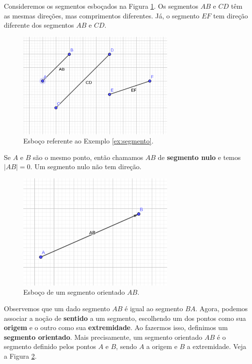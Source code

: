 \begin{ex}\label{ex:segmento}
  Consideremos os segmentos esboçados na Figura \ref{fig:ex_segmento}. Os segmentos $AB$ e $CD$ têm as mesmas direções, mas comprimentos diferentes. Já, o segmento $EF$ tem direção diferente dos segmentos $AB$ e $CD$.
  
  \begin{figure}[h!]
    \centering
    \includegraphics[width=0.7\textwidth]{./cap_vetor/dados/fig_ex_segmento/fig_ex_segmento}
  \caption{Esboço referente ao Exemplo \ref{ex:segmento}.}
  \label{fig:ex_segmento}
\end{figure}
\end{ex}

Se $A$ e $B$ são o mesmo ponto, então chamamos $AB$ de {\bf segmento nulo} e temos $|AB| = 0$. Um segmento nulo não tem direção.

\begin{figure}[h!]
  \centering
  \includegraphics[width=0.7\textwidth]{./cap_vetor/dados/fig_seg_orientado/fig_seg_orientado}
  \caption{Esboço de um segmento orientado $AB$.}
  \label{fig:seg_orientado}
\end{figure}


Observemos que um dado segmento $AB$ é igual ao segmento $BA$. Agora, podemos associar a noção de {\bf sentido} a um segmento, escolhendo um dos pontos como sua {\bf origem} e o outro como sua {\bf extremidade}. Ao fazermos isso, definimos um {\bf segmento orientado}. Mais precisamente, um segmento orientado $AB$ é o segmento definido pelos pontos $A$ e $B$, sendo $A$ a origem e $B$ a extremidade. Veja a Figura \ref{fig:seg_orientado}.

